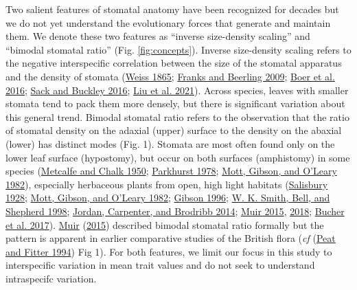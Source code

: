 \documentclass[
  10pt,
]{article}
\begin{document}
Two salient features of stomatal anatomy have been recognized for decades but we do not yet understand the evolutionary forces that generate and maintain them. We denote these two features as ``inverse size-density scaling'' and ``bimodal stomatal ratio'' (Fig. \ref{fig:concepts}). Inverse size-density scaling refers to the negative interspecific correlation between the size of the stomatal apparatus and the density of stomata (\protect\hyperlink{ref-weiss_untersuchungen_1865}{Weiss 1865}; \protect\hyperlink{ref-franks_maximum_2009}{Franks and Beerling 2009}; \protect\hyperlink{ref-de_boer_optimal_2016}{Boer et al. 2016}; \protect\hyperlink{ref-sack_developmental_2016}{Sack and Buckley 2016}; \protect\hyperlink{ref-liu_scaling_2021}{Liu et al. 2021}). Across species, leaves with smaller stomata tend to pack them more densely, but there is significant variation about this general trend. Bimodal stomatal ratio refers to the observation that the ratio of stomatal density on the adaxial (upper) surface to the density on the abaxial (lower) has distinct modes (Fig. 1). Stomata are most often found only on the lower leaf surface (hypostomy), but occur on both surfaces (amphistomy) in some species (\protect\hyperlink{ref-metcalfe_anatomy_1950}{Metcalfe and Chalk 1950}; \protect\hyperlink{ref-parkhurst_adaptive_1978}{Parkhurst 1978}; \protect\hyperlink{ref-mott_adaptive_1982}{Mott, Gibson, and O'Leary 1982}), especially herbaceous plants from open, high light habitats (\protect\hyperlink{ref-salisbury_i_1928}{Salisbury 1928}; \protect\hyperlink{ref-mott_adaptive_1982}{Mott, Gibson, and O'Leary 1982}; \protect\hyperlink{ref-gibson_structure-function_1996}{Gibson 1996}; \protect\hyperlink{ref-smith_associations_1998}{W. K. Smith, Bell, and Shepherd 1998}; \protect\hyperlink{ref-jordan_using_2014}{Jordan, Carpenter, and Brodribb 2014}; \protect\hyperlink{ref-muir_making_2015}{Muir 2015}, \protect\hyperlink{ref-muir_light_2018}{2018}; \protect\hyperlink{ref-bucher_stomatal_2017}{Bucher et al. 2017}). \protect\hyperlink{ref-muir_making_2015}{Muir} (\protect\hyperlink{ref-muir_making_2015}{2015}) described bimodal stomatal ratio formally but the pattern is apparent in earlier comparative studies of the British flora (\emph{cf} (\protect\hyperlink{ref-peat_comparative_1994}{Peat and Fitter 1994}) Fig 1). For both features, we limit our focus in this study to interspecific variation in mean trait values and do not seek to understand intraspecifc variation.
\end{document}
